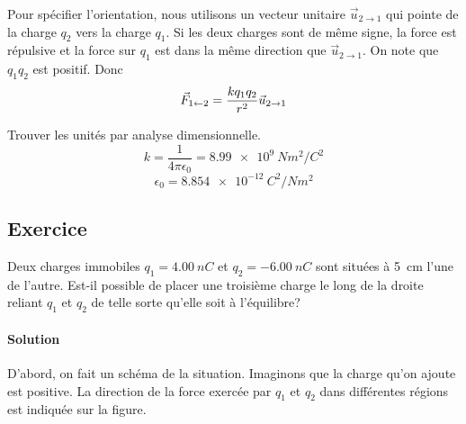   Pour spécifier l'orientation, nous utilisons un vecteur unitaire $\vec{u}_{2
  \rightarrow 1}$ qui pointe de la charge $q_2$ vers la charge $q_1$. Si les
  deux charges sont de même signe, la force est répulsive et la force sur $q_1$
  est dans la même direction que $\vec{u}_{2 \rightarrow 1}$. On note que
  $q_1q_2$ est positif. Donc
  $$\vec{F}_{1 \leftarrow 2} = \frac{kq_1q_2}{r^2}\vec{u}_{2 \rightarrow 1}$$

  Trouver les unités par analyse dimensionnelle.
  $$k = \frac{1}{4\pi\epsilon_0} = \SI{8.99e9}{N m^2 / C^2}$$
  $$\epsilon_0 = \SI{8.854e-12}{C^2 / N m^2}$$



\subsection*{Exercice}
  Deux charges immobiles $q_1 = \SI{4.00}{nC}$ et $q_2 = \SI{-6.00}{nC}$ sont
  situées à \SI{5}{cm} l'une de l'autre.
  Est-il possible de placer une troisième charge le long de la droite reliant
  $q_1$ et $q_2$ de telle sorte qu'elle soit à l'équilibre?


\sectionline


\paragraph{Solution}

D'abord, on fait un schéma de la situation. Imaginons que la charge qu'on
ajoute est positive. La direction de la force exercée par $q_1$ et $q_2$ dans
différentes régions est indiquée sur la figure.

\begin{center}
\end{center}

